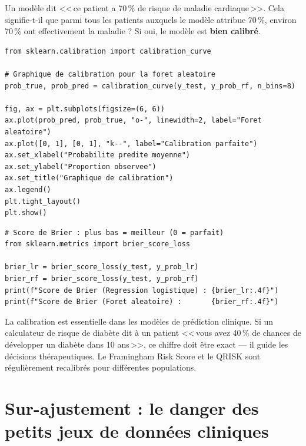 Un mod\`ele dit <<\,ce patient a 70\,\% de risque de maladie cardiaque\,>>. Cela signifie-t-il que parmi tous les patients auxquels le mod\`ele attribue 70\,\%, environ 70\,\% ont effectivement la maladie ? Si oui, le mod\`ele est \textbf{bien calibr\'e}.

\begin{verbatim}
from sklearn.calibration import calibration_curve

# Graphique de calibration pour la foret aleatoire
prob_true, prob_pred = calibration_curve(y_test, y_prob_rf, n_bins=8)

fig, ax = plt.subplots(figsize=(6, 6))
ax.plot(prob_pred, prob_true, "o-", linewidth=2, label="Foret aleatoire")
ax.plot([0, 1], [0, 1], "k--", label="Calibration parfaite")
ax.set_xlabel("Probabilite predite moyenne")
ax.set_ylabel("Proportion observee")
ax.set_title("Graphique de calibration")
ax.legend()
plt.tight_layout()
plt.show()
\end{verbatim}

\begin{verbatim}
# Score de Brier : plus bas = meilleur (0 = parfait)
from sklearn.metrics import brier_score_loss

brier_lr = brier_score_loss(y_test, y_prob_lr)
brier_rf = brier_score_loss(y_test, y_prob_rf)
print(f"Score de Brier (Regression logistique) : {brier_lr:.4f}")
print(f"Score de Brier (Foret aleatoire) :       {brier_rf:.4f}")
\end{verbatim}

\begin{clinicalnote}
La calibration est essentielle dans les mod\`eles de pr\'ediction clinique. Si un calculateur de risque de diab\`ete dit \`a un patient <<\,vous avez 40\,\% de chances de d\'evelopper un diab\`ete dans 10 ans\,>>, ce chiffre doit \^etre exact --- il guide les d\'ecisions th\'erapeutiques. Le Framingham Risk Score et le QRISK sont r\'eguli\`erement recalibr\'es pour diff\'erentes populations.
\end{clinicalnote}

\section{Sur-ajustement : le danger des petits jeux de donn\'ees cliniques}

